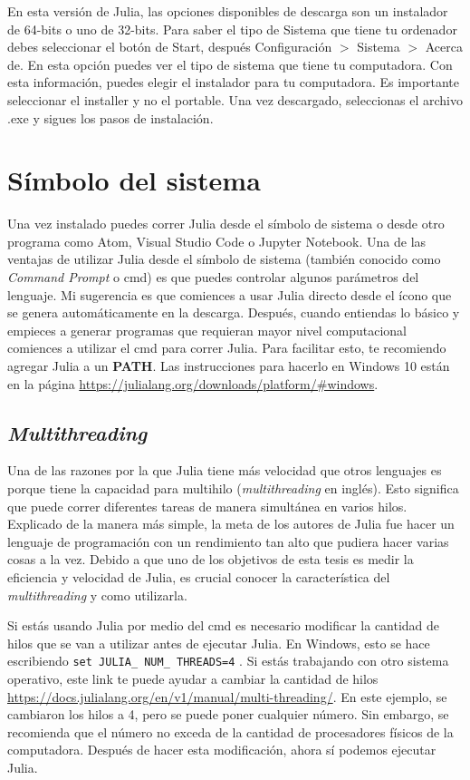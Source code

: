 En esta versión de Julia, las opciones disponibles de descarga son un instalador de 64-bits o uno de 32-bits. Para saber el tipo de Sistema que tiene tu ordenador debes seleccionar el botón de \textsf{Start}, después \textsf{Configuración} $>$ \textsf{Sistema} $>$ \textsf{Acerca de}. En esta opción puedes ver el tipo de sistema que tiene tu computadora. Con esta información, puedes elegir el instalador para tu computadora. Es importante seleccionar el \textsf{installer} y no el \textsf{portable}. Una vez descargado, seleccionas el archivo \textsf{.exe} y sigues los pasos de instalación. 

\section{Símbolo del sistema}
Una vez instalado puedes correr Julia desde el símbolo de sistema o desde otro programa como Atom, Visual Studio Code o Jupyter Notebook. Una de las ventajas de utilizar Julia desde el símbolo de sistema (también conocido como \textit{Command Prompt} o cmd) es que puedes controlar algunos parámetros del lenguaje. Mi sugerencia es que comiences a usar Julia directo desde el ícono que se genera automáticamente en la descarga. Después, cuando entiendas lo básico y empieces a generar programas que requieran mayor nivel computacional comiences a utilizar el cmd para correr Julia. Para facilitar esto, te recomiendo agregar Julia a un \textbf{PATH}. Las instrucciones para hacerlo en Windows 10 están en la página \url{https://julialang.org/downloads/platform/#windows}.

\subsection{\textit{Multithreading}}
Una de las razones por la que Julia tiene más velocidad que otros lenguajes es porque  tiene la capacidad para multihilo (\textit{multithreading} en inglés). Esto significa que puede correr diferentes tareas de manera simultánea en varios hilos. Explicado de la manera más simple, la meta de los autores de Julia fue hacer un lenguaje de programación con un rendimiento tan alto que pudiera hacer varias cosas a la vez. Debido a que uno de los objetivos de esta tesis es medir la eficiencia y velocidad de Julia, es crucial conocer la característica del \textit{multithreading} y como utilizarla. 

Si estás usando Julia por medio del cmd es necesario modificar la cantidad de hilos que se van a utilizar antes de ejecutar Julia.  En Windows, esto se hace escribiendo \texttt{set JULIA\_ NUM\_ THREADS=4} \citep{manual_Julia}. Si estás trabajando con otro sistema operativo, este link te puede ayudar a cambiar la cantidad de hilos \url{https://docs.julialang.org/en/v1/manual/multi-threading/}. En este ejemplo, se cambiaron los hilos a 4, pero se puede poner cualquier número. Sin embargo, se recomienda que el número no exceda de la cantidad de procesadores físicos de la computadora. Después de hacer esta modificación, ahora sí podemos ejecutar Julia. 
  
